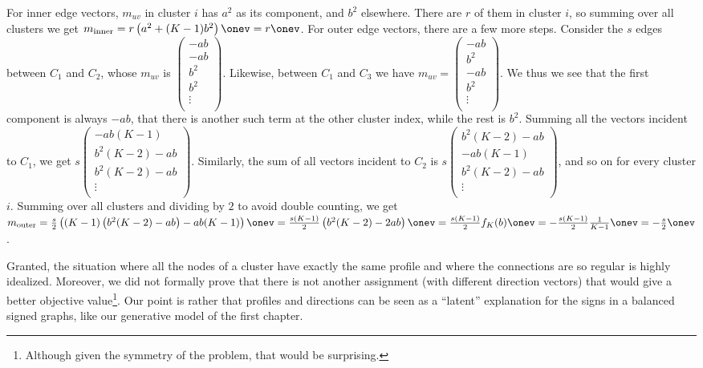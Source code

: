 \begin{aside}
For inner edge vectors, $m_{uv}$ in cluster $i$ has $a^2$ as its \ith{} component, and $b^2$
elsewhere. There are $r$ of them in cluster $i$, so summing over all clusters we get
$m_{\mathrm{inner}} = r\left(a^2 + (K-1)b^2\right)\onev = r\onev$.
For outer edge vectors, there are a few more steps. Consider the $s$ edges between $C_1$ and $C_2$,
whose $m_{uv}$ is
$\begin{pmatrix}
  -ab \\
  -ab \\
  b^2 \\
  b^2 \\
  \vdots \\  
\end{pmatrix}$. Likewise, between $C_1$ and $C_3$ we have
$m_{uv}=\begin{pmatrix}
  -ab \\
  b^2 \\
  -ab \\
  b^2 \\
  \vdots \\  
\end{pmatrix}$. We thus we see that the first component is always $-ab$, that there is another
such term at the other cluster index, while the rest is $b^2$. Summing all the vectors incident to
$C_1$, we get
$s\begin{pmatrix}
  -ab(K-1) \\
  b^2(K-2) -ab \\
  b^2(K-2) -ab \\
  \vdots \\  
\end{pmatrix}$. Similarly, the sum of all vectors incident to $C_2$ is
$s\begin{pmatrix}
  b^2(K-2) -ab \\
  -ab(K-1) \\
  b^2(K-2) -ab \\
  \vdots \\  
\end{pmatrix}$, and so on for every cluster $i$. Summing over all clusters and dividing by $2$ to
avoid double counting, we get $m_{\mathrm{outer}} = \frac{s}{2}\left( (K-1)\left(b^2(K-2) -ab\right)
-ab(K-1) \right)\onev = \frac{s(K-1)}{2}\left(b^2(K-2) -2ab\right)\onev =
\frac{s(K-1)}{2}f_K(b)\onev = -\frac{s(K-1)}{2} \frac{1}{K-1} \onev = -\frac{s}{2}\onev$.
\end{aside}

Granted, the situation where all the nodes of a cluster have exactly the same profile and where the
connections are so regular is highly idealized. Moreover, we did not formally prove that there is
not another assignment (with different direction vectors) that would give a better objective
value\footnote{Although given the symmetry of the problem, that would be surprising.}. Our point is
rather that profiles and directions can be seen as a \enquote{latent} explanation for the signs in
a balanced signed graphs, like our generative model of the first chapter.

